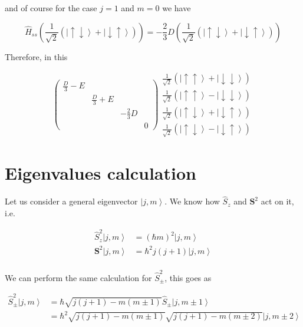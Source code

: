 \documentclass[A4paper, 12pt]{article}
\newcommand{\uu}{\left | \uparrow\uparrow \right \rangle}
\newcommand{\dd}{\left | \downarrow\downarrow \right \rangle}
\newcommand{\du}{\left | \downarrow\uparrow \right \rangle}
\newcommand{\ud}{\left | \uparrow\downarrow \right \rangle}
\newcommand{\mone}{\frac{1}{\sqrt{2}}\left( \ud + \du\right)}
\newcommand{\mmone}{\frac{1}{\sqrt{2}}\left( \ud - \du\right)}
\newcommand{\x}{\frac{1}{\sqrt 2}\left( \uu + \dd\right)}
\newcommand{\y}{\frac{1}{\sqrt 2}\left( \uu - \dd\right)}
\begin{document}
and of course for the case $ j=1 $ and $ m=0 $ we have

\begin{equation}
  \hat{H} _{ss} \left( \mone \right) = -\frac{2}{3}D \left( \mone \right)
\end{equation}

Therefore, in this

\begin{equation}
  \begin{pmatrix}
    \frac{D}{3} - E &                 &               &   \\
                    & \frac{D}{3} + E &               &   \\
                    &                 & -\frac{2}{3}D &   \\
                    &                 &               & 0
  \end{pmatrix}
  \begin{matrix}
    \x     \\
    \y     \\
    \mone  \\
    \mmone
  \end{matrix}
\end{equation}






\appendix
\section{Eigenvalues calculation} %
\label{sec:eigenvalues_calculation}

Let us consider a general eigenvector $ \left | j,m \right \rangle  $. We know
how $ \hat{S}_{z}  $ and $ \mathbf{S}^{2}  $ act on it, i.e.

\begin{align*}
\hat{S}_{z}^{2}  \left | j,m \right \rangle        & =
(\hbar m)^{2} \left | j,m \right \rangle        \\
\mathbf{S}^{2}  \left | j,m \right \rangle         & =
\hbar^{2}  j(j+1)\left | j,m \right \rangle   \\
\end{align*}

We can perform the same calculation for $ \hat{S}_{\pm}^{2}  $, this goes as

\begin{align*}
\hat{S}_{\pm}^{2} \left | j,m \right \rangle &=
  \hbar\sqrt{j(j+1)- m(m\pm 1) }
\hat{S}_{\pm} \left | j,m\pm 1 \right \rangle \\
&=
  \hbar^{2}\sqrt{j(j+1)- m(m\pm 1) }
\sqrt{j(j+1)- m(m\pm 2) }
\left | j,m\pm 2 \right \rangle \\
\end{align*}
\end{document}
